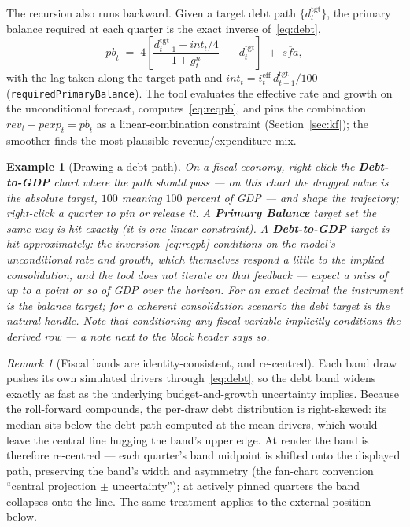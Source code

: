 \documentclass[11pt]{article}
\newcommand{\ui}[1]{\textbf{#1}}
\theoremstyle{plain}
\newtheorem{example}{Example}
\theoremstyle{remark}
\newtheorem{remark}{Remark}
\begin{document}
The recursion also runs backward. Given a target debt path
$\{d^{\text{tgt}}_t\}$, the primary balance required at each quarter is
the exact inverse of~\eqref{eq:debt},
\begin{equation}\label{eq:reqpb}
  \mathit{pb}_t \;=\;
  4\left[\frac{d^{\text{tgt}}_{t-1} + \mathit{int}_t/4}{1 + g^{n}_t}
        \;-\; d^{\text{tgt}}_t\right]
  \;+\; \overline{\mathit{sfa}},
\end{equation}
with the lag taken along the target path and
$\mathit{int}_t = i^{\text{eff}}_t\, d^{\text{tgt}}_{t-1}/100$
(\texttt{requiredPrimaryBalance}). The tool evaluates the effective rate
and growth on the unconditional forecast, computes~\eqref{eq:reqpb},
and pins the combination
$\mathit{rev}_t - \mathit{pexp}_t = \mathit{pb}_t$ as a
linear-combination constraint (Section~\ref{sec:kf}); the smoother finds
the most plausible revenue/expenditure mix.

\begin{example}[Drawing a debt path]\label{ex:debt}
On a fiscal economy, right-click the \ui{Debt-to-GDP} chart where the
path should pass --- on this chart the dragged value is the absolute
target, $100$ meaning $100$ percent of GDP --- and shape the trajectory;
right-click a quarter to pin or release it. A \ui{Primary Balance}
target set the same way is hit \emph{exactly} (it is one linear
constraint). A \ui{Debt-to-GDP} target is hit \emph{approximately}: the
inversion~\eqref{eq:reqpb} conditions on the model's unconditional rate
and growth, which themselves respond a little to the implied
consolidation, and the tool does not iterate on that feedback --- expect
a miss of up to a point or so of GDP over the horizon. For an exact
decimal the instrument is the balance target; for a coherent
consolidation scenario the debt target is the natural handle. Note that
conditioning \emph{any} fiscal variable implicitly conditions the
derived row --- a note next to the block header says so.
\end{example}

\begin{remark}[Fiscal bands are identity-consistent, and re-centred]\label{rem:fiscalbands}
Each band draw pushes its own simulated drivers
through~\eqref{eq:debt}, so the debt band widens exactly as fast as the
underlying budget-and-growth uncertainty implies. Because the
roll-forward compounds, the per-draw debt distribution is right-skewed:
its median sits below the debt path computed at the mean drivers, which
would leave the central line hugging the band's upper edge. At render
the band is therefore re-centred --- each quarter's band midpoint is
shifted onto the displayed path, preserving the band's width and
asymmetry (the fan-chart convention ``central projection $\pm$
uncertainty''); at actively pinned quarters the band collapses onto the
line. The same treatment applies to the external position below.
\end{remark}
\end{document}
